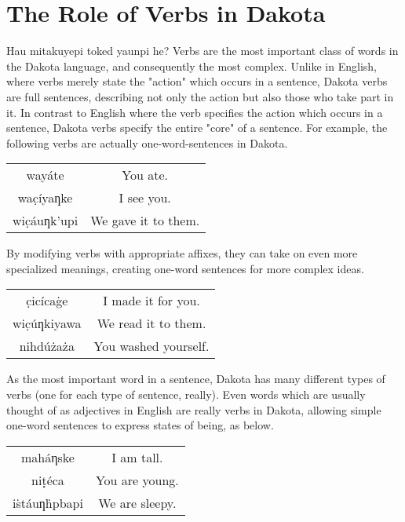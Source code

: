\documentclass[10pt,letter]{article}
\newcommand\dak[1]{{\dakota #1}}
\newenvironment{BilingCol}
{\begin{center}\begin{tabular}{>{\dakota}c>{}c}

}
{\end{tabular}\end{center}}
\begin{document}
    \title{\rmfamily\normalfont{}}
    \date{} %
    \maketitle
    

    
    \section{The Role of Verbs in Dakota}

\dak{Hau mitakuyepi toked yaunpi he?}  Verbs are the most important class of words in the Dakota language, and consequently the most complex.  Unlike in English, where verbs merely state the "action" which occurs in a sentence, Dakota verbs are full sentences, describing not only the action but also those who take part in it. In contrast to English where the verb specifies the action which occurs in a sentence, Dakota verbs specify the entire "core" of a sentence.  For example, the following verbs are actually one-word-sentences in Dakota. 

\begin{BilingCol}
wayáte & You ate. \\
wac̣íyaƞke & I see you.\\
wic̣áuƞk’upi & We gave it to them.
\end{BilingCol}

By modifying verbs with appropriate affixes, they can take on even more specialized meanings, creating one-word sentences for more complex ideas.

\begin{BilingCol}
c̣icícaġe &  I made it for you. \\
wic̣úƞkiyawa & We read it to them.\\
nihdúżaża & You washed yourself.
\end{BilingCol}

As the most important word in a sentence, Dakota has many different types of verbs (one for each type of sentence, really).  Even words which are usually thought of as adjectives in English are really verbs in Dakota, allowing simple one-word sentences to express states of being, as below.

\begin{BilingCol}
maháηske &  I am tall. \\
niṭ̣éca & You are young.\\
iṡtáuƞḣpbapi & We are sleepy.
\end{BilingCol}
\end{document}
